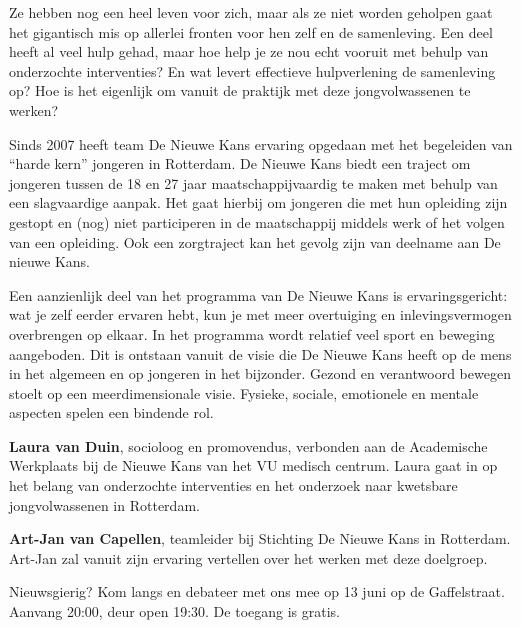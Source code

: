 \documentclass{article}
\begin{document}
\vfill

Ze hebben nog een heel leven voor zich, maar als ze niet worden geholpen gaat
het gigantisch mis op allerlei fronten voor hen zelf en de samenleving. Een
deel heeft al veel hulp gehad, maar hoe help je ze nou echt vooruit met behulp
van onderzochte interventies? En wat levert effectieve hulpverlening de
samenleving op? Hoe is het eigenlijk om vanuit de praktijk met deze
jongvolwassenen te werken?

\vfill


Sinds 2007 heeft team De Nieuwe Kans ervaring opgedaan met het begeleiden van
``harde kern'' jongeren in Rotterdam. De Nieuwe Kans biedt een traject om
jongeren tussen de 18 en 27 jaar maatschappijvaardig te maken met behulp van
een slagvaardige aanpak. Het gaat hierbij om jongeren die met hun opleiding
zijn gestopt en (nog) niet participeren in de maatschappij middels werk of het
volgen van een opleiding. Ook een zorgtraject kan het gevolg zijn van deelname
aan De nieuwe Kans.

Een aanzienlijk deel van het programma van De Nieuwe Kans is ervaringsgericht:
wat je zelf eerder ervaren hebt, kun je met meer overtuiging en
inlevingsvermogen overbrengen op elkaar. In het programma wordt relatief veel
sport en beweging aangeboden. Dit is ontstaan vanuit de visie die De Nieuwe
Kans heeft op de mens in het algemeen en op jongeren in het bijzonder. Gezond
en verantwoord bewegen stoelt op een meerdimensionale visie. Fysieke, sociale,
emotionele en mentale aspecten spelen een bindende rol.

\vfill


\textbf{Laura van Duin},
  socioloog en promovendus, verbonden aan de Academische Werkplaats bij de
  Nieuwe Kans van het VU medisch centrum. Laura gaat in op het belang van
  onderzochte interventies en het onderzoek naar kwetsbare jongvolwassenen in
  Rotterdam.

\textbf{Art-Jan van Capellen},
  teamleider bij Stichting De Nieuwe Kans in Rotterdam. Art-Jan zal vanuit zijn
  ervaring vertellen over het werken met deze doelgroep.

\vfill

Nieuwsgierig? Kom langs en debateer met ons mee op 13 juni op de Gaffelstraat.
Aanvang 20:00, deur open 19:30. De toegang is gratis.

\myhline
\end{document}
